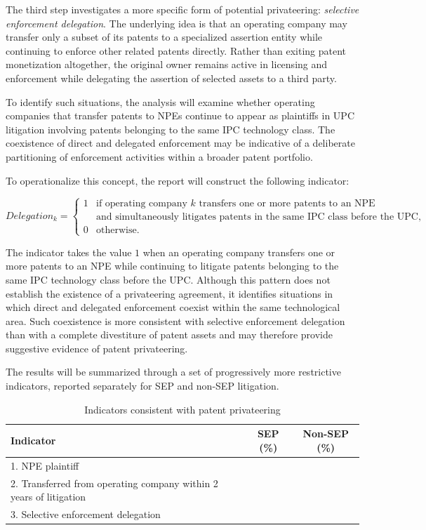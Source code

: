 \documentclass[12pt]{article}
\begin{document}
The third step investigates a more specific form of potential privateering: \emph{selective enforcement delegation}. The underlying idea is that an operating company may transfer only a subset of its patents to a specialized assertion entity while continuing to enforce other related patents directly. Rather than exiting patent monetization altogether, the original owner remains active in licensing and enforcement while delegating the assertion of selected assets to a third party.

To identify such situations, the analysis will examine whether operating companies that transfer patents to NPEs continue to appear as plaintiffs in UPC litigation involving patents belonging to the same IPC technology class. The coexistence of direct and delegated enforcement may be indicative of a deliberate partitioning of enforcement activities within a broader patent portfolio.

To operationalize this concept, the report will construct the following indicator:

\[
Delegation_k =
\begin{cases}
1 & \text{if operating company } k \text{ transfers one or more patents to an NPE} \\
  & \text{and simultaneously litigates patents in the same IPC class before the UPC,} \\
0 & \text{otherwise.}
\end{cases}
\]

The indicator takes the value \(1\) when an operating company transfers one or more patents to an NPE while continuing to litigate patents belonging to the same IPC technology class before the UPC. Although this pattern does not establish the existence of a privateering agreement, it identifies situations in which direct and delegated enforcement coexist within the same technological area. Such coexistence is more consistent with selective enforcement delegation than with a complete divestiture of patent assets and may therefore provide suggestive evidence of patent privateering.

The results will be summarized through a set of progressively more restrictive indicators, reported separately for SEP and non-SEP litigation.


\begin{table}[htbp]
\centering
\caption{Indicators consistent with patent privateering}
\label{tab:privateering}
\begin{tabular}{lcc}
\toprule
Indicator & SEP (\%) & Non-SEP (\%) \\
\midrule
1. NPE plaintiff & & \\
2. Transferred from operating company within 2 years of litigation & & \\
3. Selective enforcement delegation & & \\
\bottomrule
\end{tabular}
\end{table}
\end{document}
